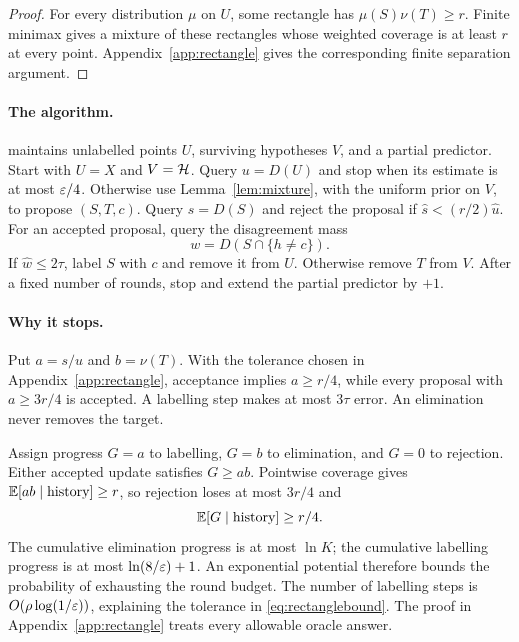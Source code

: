 \begin{proof}
For every distribution $\mu$ on $U$, some rectangle has $\mu(S)\nu(T)\ge r$. Finite minimax gives a mixture of these rectangles whose weighted coverage is at least $r$ at every point. Appendix~\ref{app:rectangle} gives the corresponding finite separation argument.
\end{proof}

\paragraph{The algorithm.}\label{alg:rectify}
\Rectify{} maintains unlabelled points $U$, surviving hypotheses $V$, and a partial predictor. Start with $U=X$ and $V=\mathcal H$. Query $u=D(U)$ and stop when its estimate is at most $\varepsilon/4$. Otherwise use Lemma~\ref{lem:mixture}, with the uniform prior on $V$, to propose $(S,T,c)$. Query $s=D(S)$ and reject the proposal if $\widehat s<(r/2)\widehat u$. For an accepted proposal, query the disagreement mass
\[
 w=D(S\cap\{h\ne c\}).
\]
If $\widehat w\le2\tau$, label $S$ with $c$ and remove it from $U$. Otherwise remove $T$ from $V$. After a fixed number of rounds, stop and extend the partial predictor by $+1$.



\paragraph{Why it stops.}
Put $a=s/u$ and $b=\nu(T)$. With the tolerance chosen in Appendix~\ref{app:rectangle}, acceptance implies $a\ge r/4$, while every proposal with $a\ge3r/4$ is accepted. A labelling step makes at most $3\tau$ error. An elimination never removes the target.

Assign progress $G=a$ to labelling, $G=b$ to elimination, and $G=0$ to rejection. Either accepted update satisfies $G\ge ab$. Pointwise coverage gives $\mathbb E[ab\mid\text{history}]\ge r$, so rejection loses at most $3r/4$ and
\begin{equation}
 \mathbb E[G\mid\text{history}]\ge r/4.
 \label{eq:drift}
\end{equation}
The cumulative elimination progress is at most $\ln K$; the cumulative labelling progress is at most $\ln(8/\varepsilon)+1$. An exponential potential therefore bounds the probability of exhausting the round budget. The number of labelling steps is $O(\rho\log(1/\varepsilon))$, explaining the tolerance in \eqref{eq:rectanglebound}. The proof in Appendix~\ref{app:rectangle} treats every allowable oracle answer.

